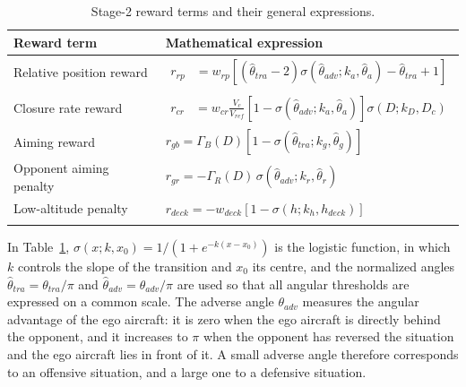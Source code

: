 \documentclass[pdflatex,sn-mathphys-num]{sn-jnl}%
\theoremstyle{thmstyleone}%
\theoremstyle{thmstyletwo}%
\theoremstyle{thmstylethree}%
\begin{document}
\begin{table}[h]
\caption{Stage-2 reward terms and their general expressions.}\label{tab:reward_stage2}%
\begin{tabular*}{\textwidth}{@{\extracolsep\fill}p{}p{}}
\toprule
Reward term & Mathematical expression \\
\midrule
Relative position reward
& $\begin{aligned}
r_{rp}
&=w_{rp}\left[\left(\hat{\theta}_{tra}-2\right)
\sigma\left(\hat{\theta}_{adv};k_{a},\hat{\theta}_{a}\right)
-\hat{\theta}_{tra}+1\right]
\end{aligned}$ \\[10pt]

Closure rate reward
& $\begin{aligned}
r_{cr}
&=w_{cr}\frac{V_{c}}{V_{ref}}
\left[1-\sigma\left(\hat{\theta}_{adv};k_{a},\hat{\theta}_{a}\right)\right]
\sigma\left(D;k_{D},D_{c}\right)
\end{aligned}$ \\[10pt]

Aiming reward
& $r_{gb}=\Gamma_{B}(D)\left[1-\sigma\left(\hat{\theta}_{tra};k_{g},\hat{\theta}_{g}\right)\right]$ \\[8pt]

Opponent aiming penalty
& $r_{gr}=-\Gamma_{R}(D)\,\sigma\left(\hat{\theta}_{adv};k_{r},\hat{\theta}_{r}\right)$ \\[8pt]

Low-altitude penalty
& $r_{deck}=-w_{deck}\left[1-\sigma\left(h;k_{h},h_{deck}\right)\right]$ \\
\botrule
\end{tabular*}
\end{table}

In Table~\ref{tab:reward_stage2}, $\sigma(x;k,x_0)=1/(1+e^{-k(x-x_0)})$ is the logistic function, in which $k$ controls the slope of the transition and $x_0$ its centre, and the normalized angles $\hat{\theta}_{tra}=\theta_{tra}/\pi$ and $\hat{\theta}_{adv}=\theta_{adv}/\pi$ are used so that all angular thresholds are expressed on a common scale. The adverse angle $\theta_{adv}$ measures the angular advantage of the ego aircraft: it is zero when the ego aircraft is directly behind the opponent, and it increases to $\pi$ when the opponent has reversed the situation and the ego aircraft lies in front of it. A small adverse angle therefore corresponds to an offensive situation, and a large one to a defensive situation.
\end{document}
